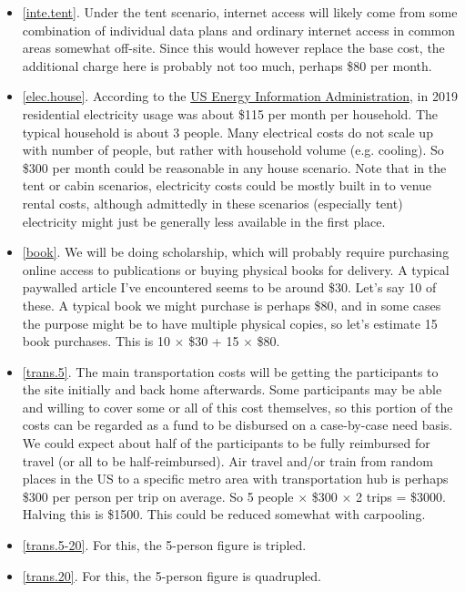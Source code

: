 \documentclass[10pt]{article}
\begin{document}
\begin{itemize}[leftmargin=*]
  \item[]{\ref{inte.tent}. Under the tent scenario, internet access will likely come from some combination of individual data plans and ordinary internet access in common areas somewhat off-site. Since this would however replace the base cost, the additional charge here is probably not too much, perhaps \$80 per month.}
  \item[]{\ref{elec.house}. According to the \href{https://www.eia.gov/todayinenergy/detail.php?id=46276#:~:text=In%202019%2C%20the%20average%20monthly,%24118%20to%20%24115%20per%20month.}{US Energy Information Administration}, in 2019 residential electricity usage was about \$115 per month per household. The typical household is about 3 people. Many electrical costs do not scale up with number of people, but rather with household volume (e.g. cooling). So \$300 per month could be reasonable in any house scenario. Note that in the tent or cabin scenarios, electricity costs could be mostly built in to venue rental costs, although admittedly in these scenarios (especially tent) electricity might just be generally less available in the first place.}
  \item[]{\ref{book}. We will be doing scholarship, which will probably require purchasing online access to publications or buying physical books for delivery. A typical paywalled article I've encountered seems to be around \$30. Let's say 10 of these. A typical book we might purchase is perhaps \$80, and in some cases the purpose might be to have multiple physical copies, so let's estimate 15 book purchases. This is 10 $\times$ \$30 + 15 $\times$ \$80.}
  \item[]{\ref{trans.5}. The main transportation costs will be getting the participants to the site initially and back home afterwards. Some participants may be able and willing to cover some or all of this cost themselves, so this portion of the costs can be regarded as a fund to be disbursed on a case-by-case need basis. We could expect about half of the participants to be fully reimbursed for travel (or all to be half-reimbursed). Air travel and/or train from random places in the US to a specific metro area with transportation hub is perhaps \$300 per person per trip on average. So 5 people $\times$ \$300 $\times$ 2 trips = \$3000. Halving this is \$1500. This could be reduced somewhat with carpooling.}
  \item[]{\ref{trans.5-20}. For this, the 5-person figure is tripled.}
  \item[]{\ref{trans.20}. For this, the 5-person figure is quadrupled.}

\end{itemize}
\end{document}
